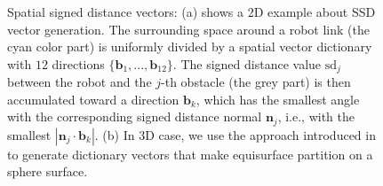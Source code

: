 \documentclass[letterpaper, 10 pt, conference]{ieeeconf}  %
\begin{document}
\begin{figure}[!h]
\centering
{}
\caption{Spatial signed distance vectors: (a) shows a 2D example about SSD vector generation. The surrounding space around a robot link (the cyan color part) is uniformly divided by a spatial vector dictionary with $12$ directions $\{\mathbf b_1, ..., \mathbf b_{12}\}$. The signed distance value $\text{sd}_j$ between the robot and the $j$-th obstacle (the grey part) is then accumulated toward a direction $\mathbf b_k$, which has the smallest angle with the corresponding signed distance normal $\mathbf n_j$, i.e., with the smallest $|\mathbf n_j \cdot \mathbf b_k|$. (b) In 3D case, we use the approach introduced in~\cite{Yershova:2010:GUI} to generate dictionary vectors that make equisurface partition on a sphere surface. }
\label{fig:trajectoryfeaturePD}
\end{figure}
\end{document}
